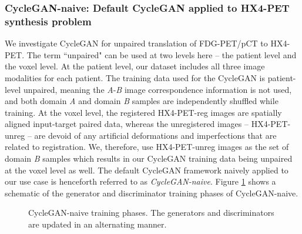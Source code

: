\subsubsection{CycleGAN-naive: Default CycleGAN applied to HX4-PET synthesis problem}
We investigate CycleGAN for unpaired translation of FDG-PET/pCT to HX4-PET. The term ``unpaired" can be used at two levels here -- the patient level and the voxel level. At the patient level, our dataset includes all three image modalities for each patient. The training data used for the CycleGAN is patient-level unpaired, meaning the \textit{A}-\textit{B} image correspondence information is not used, and both domain \textit{A} and domain \textit{B} samples are independently shuffled while training. At the voxel level, the registered HX4-PET-reg images are spatially aligned input-target paired data, whereas the unregistered images -- HX4-PET-unreg -- are devoid of any artificial deformations and imperfections that are related to registration. We, therefore, use HX4-PET-unreg images as the set of domain \textit{B} samples which results in our CycleGAN training data being unpaired at the voxel level as well. The default CycleGAN framework naively applied to our use case is henceforth referred to as \textit{CycleGAN-naive}. Figure \ref{fig:cyclegan_naive} shows a schematic of the generator and discriminator training phases of CycleGAN-naive. 

\begin{figure}[h!]
    \centering
    \caption{CycleGAN-naive training phases. The generators and discriminators are updated in an alternating manner.}
    \label{fig:cyclegan_naive}
\end{figure}{}

